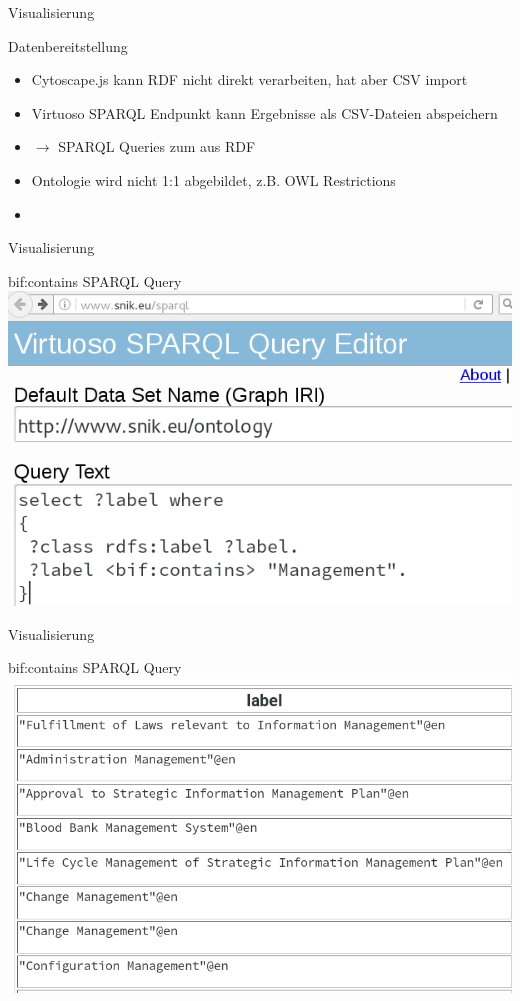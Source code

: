 \documentclass[14pt,aspectratio=1610]{beamer}
\begin{document}
\begin{frame}{Visualisierung}
\begin{block}{Datenbereitstellung}
\begin{itemize}
\item Cytoscape.js kann RDF nicht direkt verarbeiten, hat aber CSV import
\item Virtuoso SPARQL Endpunkt kann Ergebnisse als CSV-Dateien abspeichern
\item $\rightarrow$ SPARQL Queries zum aus RDF 
\item Ontologie wird nicht 1:1 abgebildet, z.B. OWL Restrictions 
\item 
\end{itemize}
\end{block}
\end{frame}

\begin{frame}{Visualisierung}
\begin{block}{bif:contains SPARQL Query}
\centering\includegraphics[width=\textwidth,height=0.7\textheight,keepaspectratio]{img/bifcontains-query.png}
\end{block}
\end{frame}

\begin{frame}{Visualisierung}
\begin{block}{bif:contains SPARQL Query}
\centering\includegraphics[width=\textwidth,height=0.7\textheight,keepaspectratio]{img/bifcontains-result.png}
\end{block}
\end{frame}
\end{document}
